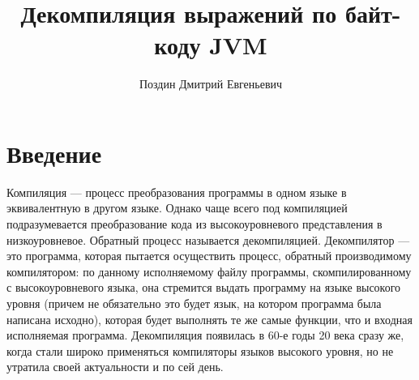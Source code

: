 






\title{Декомпиляция выражений по байт-коду JVM}
%
\author{Поздин Дмитрий Евгеньевич}
%
%
%

\maketitle              %

\begin{abstract}
\end{abstract}
%



\section*{Введение}

Компиляция — процесс преобразования программы в одном языке в эквивалентную в другом языке. Однако чаще всего под компиляцией подразумевается преобразование кода из высокоуровневого представления в низкоуровневое. Обратный процесс называется декомпиляцией. Декомпилятор --- это программа, которая пытается осуществить процесс, обратный производимому компилятором: по данному исполняемому файлу программы, скомпилированному с высокоуровневого языка, она стремится выдать программу на языке высокого уровня (причем не обязательно это будет язык, на котором программа была написана исходно), которая будет выполнять те же самые функции, что и входная исполняемая программа. Декомпиляция появилась в 60-е годы 20 века сразу же, когда стали широко применяться компиляторы языков высокого уровня, но не утратила своей актуальности и по сей день.

